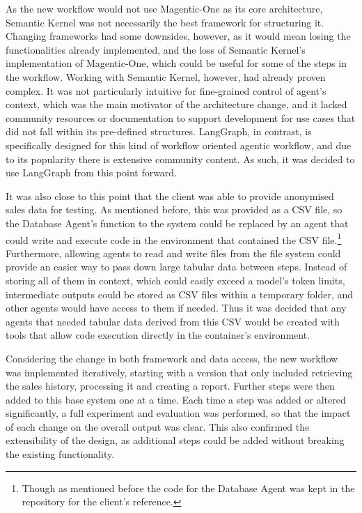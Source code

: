 \documentclass[a4paper]{report}
\begin{document}
As the new workflow would not use Magentic-One as its core architecture, Semantic Kernel was not necessarily the best framework for structuring it. Changing frameworks had some downsides, however, as it would mean losing the functionalities already implemented, and the loss of Semantic Kernel's implementation of Magentic-One, which could be useful for some of the steps in the workflow. Working with Semantic Kernel, however, had already proven complex. It was not particularly intuitive for fine-grained control of agent's context, which was the main motivator of the architecture change, and it lacked community resources or documentation to support development for use cases that did not fall within its pre-defined structures. LangGraph, in contrast, is specifically designed for this kind of workflow oriented agentic workflow, and due to its popularity there is extensive community content. As such, it was decided to use LangGraph from this point forward.

It was also close to this point that the client was able to provide anonymised sales data for testing. As mentioned before, this was provided as a CSV file, so the Database Agent's function to the system could be replaced by an agent that could write and execute code in the environment that contained the CSV file.\footnote{Though as mentioned before the code for the Database Agent was kept in the repository for the client's reference.} Furthermore, allowing agents to read and write files from the file system could provide an easier way to pass down large tabular data between steps. Instead of storing all of them in context, which could easily exceed a model's token limits, intermediate outputs could be stored as CSV files within a temporary folder, and other agents would have access to them if needed. Thus it was decided that any agents that needed tabular data derived from this CSV would be created with tools that allow code execution directly in the container's environment.

Considering the change in both framework and data access, the new workflow was implemented iteratively, starting with a version that only included retrieving the sales history, processing it and creating a report. Further steps were then added to this base system one at a time. Each time a step was added or altered significantly, a full experiment and evaluation was performed, so that the impact of each change on the overall output was clear. This also confirmed the extensibility of the design, as additional steps could be added without breaking the existing functionality.
\end{document}
